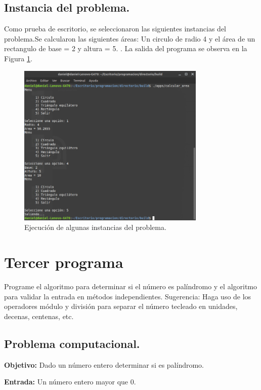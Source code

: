 \documentclass[12pt,letterpaper]{article}
\begin{document}
\subsection{Instancia del problema.}
Como prueba de escritorio, se seleccionaron las siguientes instancias del problema.Se calcularon las siguientes \'areas: Un circulo de radio 4 y el \'area de un rectangulo de base = 2 y altura = 5. . La salida del programa se observa en la Figura \ref{fig:calcular_area}.
\begin{figure}[ht!]
  \centering
  \includegraphics[width=0.8\textwidth]{figures/calcular_area}
  \caption{Ejecución de algunas instancias del problema.}
  \label{fig:calcular_area}
\end{figure}

\newpage

\section{Tercer programa}

Programe el algoritmo para determinar si el n\'umero es pal\'indromo y el algoritmo para validar la entrada en m\'etodos independientes.
Sugerencia: Haga uso de los operadores m\'odulo y divisi\'on para separar el n\'umero tecleado en unidades, decenas, centenas, etc.

\subsection{Problema computacional.}
\textbf{Objetivo:} Dado un n\'umero entero determinar si es pal\'indromo.

\textbf{Entrada:} Un n\'umero entero mayor que 0.
\end{document}
